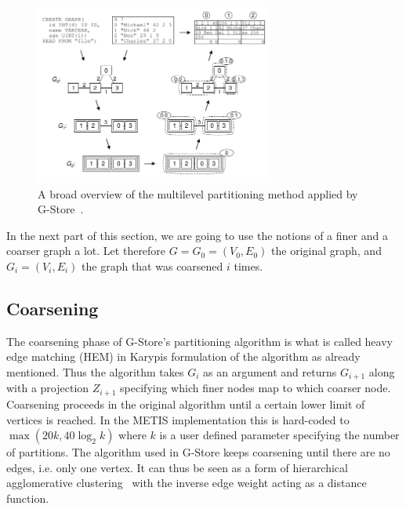     \begin{figure}[htp]
        \begin{center}
            \includegraphics[keepaspectratio,width=0.7\textwidth]{img/06-rel_w/g-store.png}
        \end{center}
        \caption{A broad overview of the multilevel partitioning method applied by G-Store~\autocite{steinhaus2010g}.} 
        \label{g-store}
    \end{figure}

    
    In the next part of this section, we are going to use the notions of a finer and a coarser graph a lot. Let therefore $G = G_0 = (V_0, E_0)$ the original graph, and $G_i = (V_i, E_i)$ the graph that was coarsened $i$ times.
    
    \subsection*{Coarsening}
    The coarsening phase of G-Store's partitioning algorithm is what is called heavy edge matching (HEM) in Karypis formulation of the algorithm as already mentioned. 
    Thus the algorithm takes $G_i$ as an argument and returns $G_{i+1}$ along with a projection $Z_{i+1}$ specifying which finer nodes map to which coarser node.
    Coarsening proceeds in the original algorithm until a certain lower limit of vertices is reached.
    In the METIS implementation this is hard-coded to  $\max \left( 20k, 40 \log_2 k\right)$ where $k$ is a user defined parameter specifying the number of partitions.
    The algorithm used in G-Store keeps coarsening until there are no edges, i.e. only one vertex.
    It can thus be seen as a form of hierarchical agglomerative clustering~\autocite{hac} with the inverse edge weight acting as a distance function.
    
